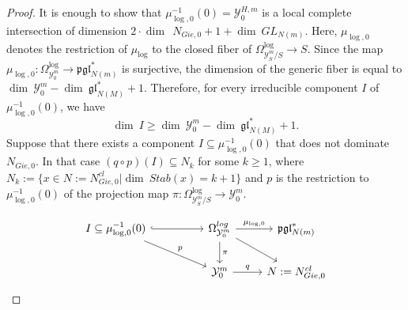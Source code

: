 \documentclass[11pt]{amsart}
\theoremstyle{plain}
\numberwithin{equation}{section}
\theoremstyle{definition}
\theoremstyle{plain}
\begin{document}
\begin{proof}
It is enough to show that $\mu_{\log,0}^{-1}(0)=\mathcal Y^{H,m}_0$ is a local complete intersection of dimension $2\cdot \dim~~N_{Gie,0}+1+\dim~GL_{N(m)}$. Here, $\mu_{\log,0}$
denotes the restriction of $\mu_{\log}$ to the closed fiber of $\Omega^{\log}_{\mathcal Y^m_S/S}\longrightarrow S$. Since the map $\mu_{\log,0}: \Omega^{\log}_{\mathcal Y^m_0}\longrightarrow \mathfrak{pgl}^*_{N(m)}$ is surjective, the dimension of the generic fiber is equal to $\dim~\mathcal Y^m_0-\dim~\mathfrak{gl}^*_{N(M)}+1$. Therefore, for every irreducible component $I$ of $\mu^{-1}_{\log,0}(0)$, we have 
\begin{equation}\label{geq}
\dim~I\geq \dim~\mathcal Y^m_0-\dim~\mathfrak{gl}^*_{N(M)}+1.
\end{equation}
Suppose that there exists a component $I\subseteq \mu^{-1}_{\log,0}(0)$ that does not dominate $N_{Gie,0}$. In that case $(q\circ p)(I)\subseteq N_k$ for some $k\geq 1$, where $N_k:=\{x\in N:=N^{cl}_{Gie, 0} | \dim~Stab(x)=k+1\}$ and $p$ is the restriction to $\mu^{-1}_{\log, 0}(0)$ of the projection map $\pi: \Omega^{\log}_{\mathcal Y^m_S/S}\rightarrow \mathcal Y^m_0$. 

\begin{equation}
\begin{tikzcd}
   I\subseteq \mu^{-1}_{\log, 0}(0)\arrow["p"]{drr} \arrow[hook]{rr} && \Omega^{log}_{\mathcal Y^m_0}\arrow["\pi"]{d}\arrow{dr}\arrow["\mu_{\log, 0}"]{r} & \mathfrak{pgl}^*_{N(m)} \\
    && \mathcal Y^m_0 \arrow["q"]{r}  & N:=N^{cl}_{Gie, 0}
\end{tikzcd}
\end{equation}


\end{proof}
\end{document}
